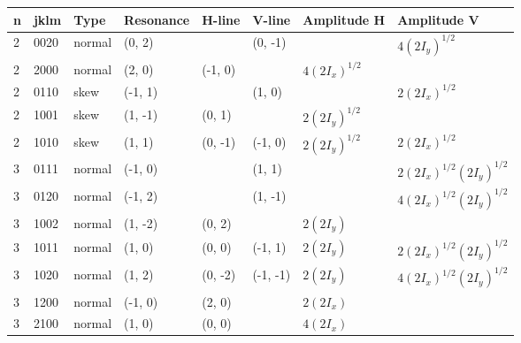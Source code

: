 {\scriptsize
\begin{longtable}{llllllll}
\toprule()
n & jklm &   Type & Resonance &   H-line &   V-line &                                       Amplitude H &                                       Amplitude V \\
\midrule()
\endhead
2 & 0020 & normal &    (0, 2) &          &  (0, -1) &                                                   &              \colorbox{red!10}{$4  (2I_y)^ {1/2}$} \\
2 & 2000 & normal &    (2, 0) &  (-1, 0) &          &           \colorbox{orange!10}{$4 (2I_x)^ {1/2} $} &                                                   \\
2 & 0110 &   skew &   (-1, 1) &          &   (1, 0) &                                                   &           \colorbox{orange!10}{$2 (2I_x)^ {1/2} $} \\
2 & 1001 &   skew &   (1, -1) &   (0, 1) &          &              \colorbox{red!10}{$2  (2I_y)^ {1/2}$} &                                                   \\
2 & 1010 &   skew &    (1, 1) &  (0, -1) &  (-1, 0) &              \colorbox{red!10}{$2  (2I_y)^ {1/2}$} &           \colorbox{orange!10}{$2 (2I_x)^ {1/2} $} \\
\midrule()
3 & 0111 & normal &   (-1, 0) &          &   (1, 1) &                                                   & \colorbox{blue!10}{$2 (2I_x)^ {1/2} (2I_y)^ {1/2}$} \\
3 & 0120 & normal &   (-1, 2) &          &  (1, -1) &                                                   & \colorbox{blue!10}{$4 (2I_x)^ {1/2} (2I_y)^ {1/2}$} \\
3 & 1002 & normal &   (1, -2) &   (0, 2) &          &                    \colorbox{red!10}{$2  (2I_y)$} &                                                   \\
3 & 1011 & normal &    (1, 0) &   (0, 0) &  (-1, 1) &                    \colorbox{red!10}{$2  (2I_y)$} & \colorbox{blue!10}{$2 (2I_x)^ {1/2} (2I_y)^ {1/2}$} \\
3 & 1020 & normal &    (1, 2) &  (0, -2) & (-1, -1) &                    \colorbox{red!10}{$2  (2I_y)$} & \colorbox{blue!10}{$4 (2I_x)^ {1/2} (2I_y)^ {1/2}$} \\
3 & 1200 & normal &   (-1, 0) &   (2, 0) &          &                 \colorbox{orange!10}{$2 (2I_x) $} &                                                   \\
3 & 2100 & normal &    (1, 0) &   (0, 0) &          &                 \colorbox{orange!10}{$4 (2I_x) $} &                                                   \\

\end{longtable}}
